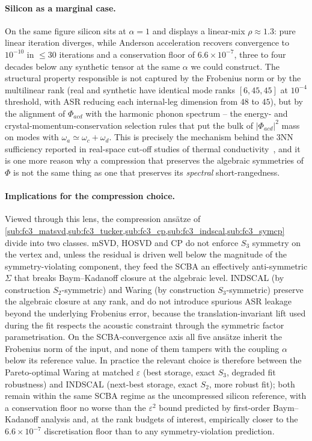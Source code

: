 \paragraph{Silicon as a marginal case.} On the same figure silicon sits at
$\alpha\!=\!1$ and displays a linear-mix $\rho\!\approx\!1.3$: pure linear iteration
diverges, while Anderson acceleration recovers convergence to $10^{-10}$ in $\le\!30$
iterations and a conservation floor of $6.6\times 10^{-7}$, three to four decades below
any synthetic tensor at the same $\alpha$ we could construct. The structural property
responsible is not captured by the Frobenius norm or by the multilinear rank (real and
synthetic have identical mode ranks $[6,45,45]$ at $10^{-4}$ threshold, with ASR
reducing each internal-leg dimension from $48$ to $45$), but by the alignment of
$\Phi_{acd}$ with the harmonic phonon spectrum -- the energy- and
crystal-momentum-conservation selection rules that put the bulk of $|\Phi_{acd}|^{2}$
mass on modes with $\omega_a\!\simeq\!\omega_c\!+\!\omega_d$. This is precisely the
mechanism behind the $3$NN sufficiency reported in real-space cut-off studies of
thermal conductivity~\cite{broido_intrinsic_2007,li_shengbte_2014}, and it is one more
reason why a compression that preserves the algebraic symmetries of $\Phi$ is not the
same thing as one that preserves its \emph{spectral} short-rangedness.

\paragraph{Implications for the compression choice.} Viewed through this lens, the
compression ans\"atze of \cref{sub:fc3_matsvd,sub:fc3_tucker,sub:fc3_cp,sub:fc3_indscal,sub:fc3_symcp}
divide into two classes. mSVD, HOSVD and CP do not enforce $S_3$ symmetry on the vertex
and, unless the residual is driven well below the magnitude of the symmetry-violating
component, they feed the SCBA an effectively anti-symmetric $\Sigma$ that breaks
Baym--Kadanoff closure at the algebraic level. INDSCAL (by construction $S_2$-symmetric)
and Waring (by construction $S_3$-symmetric) preserve the algebraic closure at any rank,
and do not introduce spurious ASR leakage beyond the underlying Frobenius error, because
the translation-invariant lift used during the fit respects the acoustic constraint
through the symmetric factor parametrisation. On the SCBA-convergence axis all five
ans\"atze inherit the Frobenius norm of the input, and none of them tampers with the
coupling $\alpha$ below its reference value. In practice the relevant choice is therefore
between the Pareto-optimal Waring at matched $\varepsilon$ (best storage, exact $S_3$,
degraded fit robustness) and INDSCAL (next-best storage, exact $S_2$, more robust fit);
both remain within the same SCBA regime as the uncompressed silicon reference, with a
conservation floor no worse than the $\varepsilon^{2}$ bound predicted by first-order
Baym--Kadanoff analysis and, at the rank budgets of interest, empirically closer to the
$6.6\times 10^{-7}$ discretisation floor than to any symmetry-violation prediction.